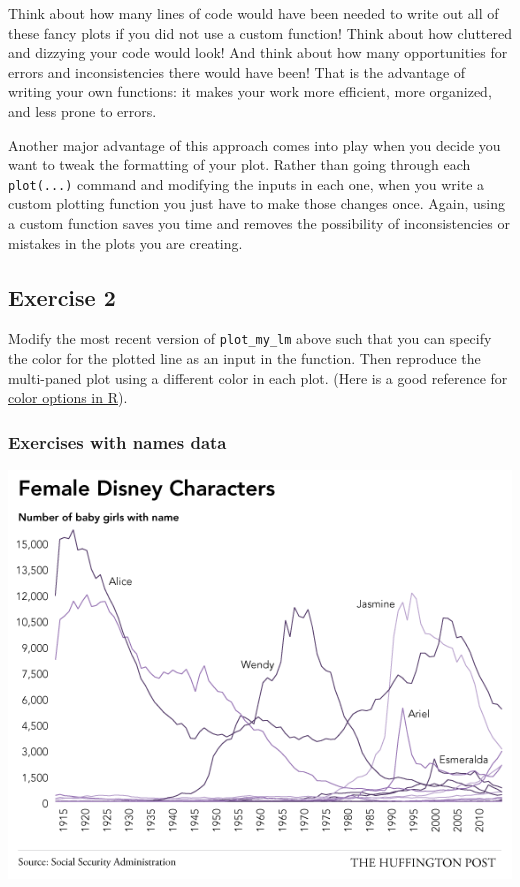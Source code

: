 \documentclass[
]{book}
\begin{document}
Think about how many lines of code would have been needed to write out all of these fancy plots if you did not use a custom function! Think about how cluttered and dizzying your code would look! And think about how many opportunities for errors and inconsistencies there would have been! That is the advantage of writing your own functions: it makes your work more efficient, more organized, and less prone to errors.

Another major advantage of this approach comes into play when you decide you want to tweak the formatting of your plot. Rather than going through each \texttt{plot(...)} command and modifying the inputs in each one, when you write a custom plotting function you just have to make those changes once. Again, using a custom function saves you time and removes the possibility of inconsistencies or mistakes in the plots you are creating.

\hypertarget{exercise-2}{%
\subsection*{Exercise 2}\label{exercise-2}}

Modify the most recent version of \texttt{plot\_my\_lm} above such that you can specify the color for the plotted line as an input in the function. Then reproduce the multi-paned plot using a different color in each plot. (Here is a good reference for \href{http://www.stat.columbia.edu/~tzheng/files/Rcolor.pdf}{color options in R}).

\hypertarget{exercises-with-names-data}{%
\subsubsection*{Exercises with names data}\label{exercises-with-names-data}}

\includegraphics{img/baby_names.png}
\end{document}
